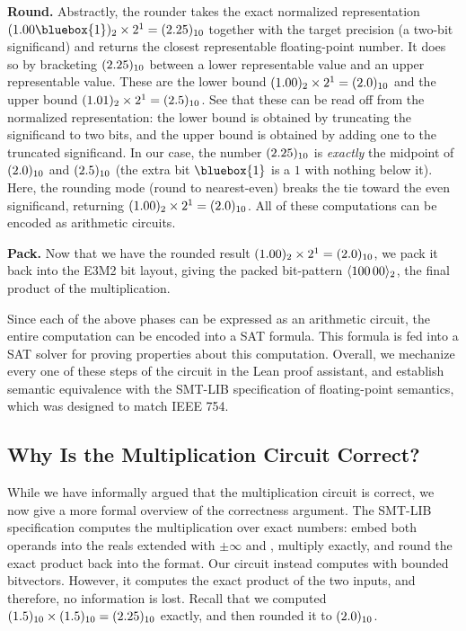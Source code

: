 \noindent\textbf{Round.}
Abstractly, the rounder takes the exact normalized representation $\basetwo{1.00\bluebox{1}} \times 2^1 = \baseten{2.25}$ together with the target
precision (a two-bit significand) and returns the closest representable floating-point number.
It does so by bracketing $(2.25)_{10}$ between a lower representable value and an upper representable value.
These are the lower bound $(1.00)_{2} \times 2^1 = (2.0)_{10}$
and the upper bound $(1.01)_{2} \times 2^1 = (2.5)_{10}$.
See that these can be read off from the normalized representation:
the lower bound is obtained by truncating the significand to two bits, and the upper bound is obtained by adding one to the truncated significand.
In our case, the number $(2.25)_{10}$ is \emph{exactly} the midpoint of $(2.0)_{10}$ and $(2.5)_{10}$ (the extra bit $\bluebox{1}$ is a $1$ with nothing below it).
Here, the rounding mode (round to nearest-even) breaks the tie toward the even significand, returning
$(1.00)_{2} \times 2^1 = (2.0)_{10}$.
All of these computations can be encoded as arithmetic circuits.

\noindent\textbf{Pack.}
Now that we have the rounded result $(1.00)_{2} \times 2^1 = (2.0)_{10}$,
we pack it back into the E3M2 bit layout, giving the packed bit-pattern $\langle 100\,00 \rangle_{2}$,
the final product of the multiplication.

Since each of the above phases can be expressed as an arithmetic circuit, the entire computation can be encoded into a SAT formula.
This formula is fed into a SAT solver for proving properties about this computation.
Overall, we mechanize every one of these steps of the circuit in the Lean proof assistant,
and establish semantic equivalence with the SMT-LIB specification of floating-point semantics,
which was designed to match IEEE 754.

\subsection{Why Is the Multiplication Circuit Correct?}\label{sec:fp:overview-correctness}

While we have informally argued that the multiplication circuit is correct,
we now give a more formal overview of the correctness argument.
The SMT-LIB specification computes the multiplication over exact
numbers: embed both operands into the reals extended with $\pm\infty$ and \nan{}, multiply exactly,
and round the exact product back into the format. Our circuit instead computes with bounded bitvectors.
However, it computes the exact product of the two inputs, and therefore, no information is lost.
Recall that we computed $(1.5)_{10} \times (1.5)_{10} = (2.25)_{10}$ exactly, and then rounded it to $(2.0)_{10}$.

